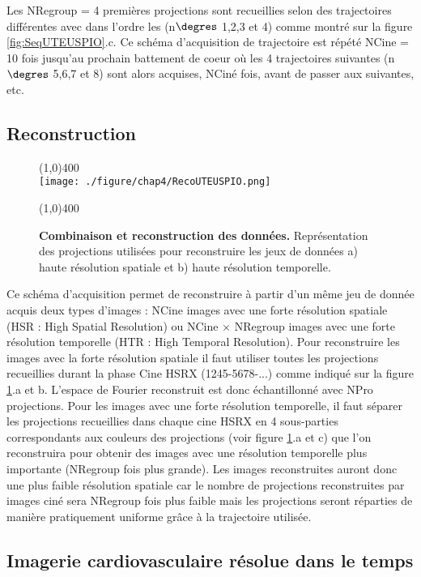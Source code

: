 Les NRegroup = 4 premières projections sont recueillies selon des trajectoires différentes  avec dans l'ordre les (n$\degres$ 1,2,3 et 4) comme montré sur la figure \ref{fig:SeqUTEUSPIO}.c. Ce schéma d'acquisition de trajectoire est répété NCine = 10 fois jusqu'au prochain battement de coeur où les 4 trajectoires suivantes (n$\degres$ 5,6,7 et 8) sont alors acquises, NCiné fois, avant de passer aux suivantes, etc.

\subsection{Reconstruction}

\begin{figure}[H]
\centering
\line(1,0){400} \\
\texttt{[image: ./figure/chap4/RecoUTEUSPIO.png]}
\caption[Combinaison et reconstruction des données.]{\label{fig:RecoUTEUSPIO} \textbf{Combinaison et reconstruction des données.} Représentation des projections utilisées pour reconstruire les jeux de données a) haute résolution spatiale et b) haute résolution temporelle.}
\line(1,0){400} \\ 
\end{figure}

Ce schéma d'acquisition permet de reconstruire à partir d'un même jeu de donnée acquis deux types d'images : NCine images avec une forte résolution spatiale (HSR : High Spatial Resolution) ou NCine $\times$ NRegroup images avec une forte résolution temporelle (HTR : High Temporal Resolution). Pour reconstruire les images avec la forte résolution spatiale il faut utiliser toutes les projections recueillies durant la phase Cine HSRX (1245-5678-...) comme indiqué sur la figure \ref{fig:RecoUTEUSPIO}.a et b. L'espace de Fourier reconstruit est donc échantillonné avec NPro projections.
Pour les images avec une forte résolution temporelle, il faut séparer les projections recueillies dans chaque cine HSRX en 4 sous-parties correspondants aux couleurs des projections (voir figure \ref{fig:RecoUTEUSPIO}.a et c) que l'on reconstruira pour obtenir des images avec une résolution temporelle plus importante (NRegroup fois plus grande). Les images reconstruites auront donc une plus faible résolution spatiale car le nombre de projections reconstruites par images ciné sera NRegroup fois plus faible mais les projections seront réparties de manière pratiquement uniforme grâce à la trajectoire utilisée.

\subsection{Imagerie cardiovasculaire résolue dans le temps}

